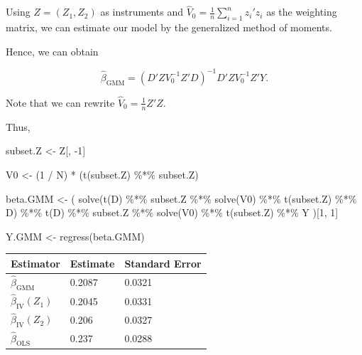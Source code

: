 \documentclass[9pt,twocolumn,twoside,]{pnas-new}
\newenvironment{Shaded}{}{}
\newcommand{\DecValTok}[1]{\textcolor[rgb]{0.25,0.63,0.44}{#1}}
\newcommand{\FunctionTok}[1]{\textcolor[rgb]{0.02,0.16,0.49}{#1}}
\newcommand{\NormalTok}[1]{#1}
\newcommand{\OtherTok}[1]{\textcolor[rgb]{0.00,0.44,0.13}{#1}}
\newcommand{\SpecialCharTok}[1]{\textcolor[rgb]{0.25,0.44,0.63}{#1}}
\begin{document}
Using \(Z = (Z_1, Z_2)\) as instruments and
\(\displaystyle \hat{V}_0 = \frac{1}{n} \sum_{i = 1}^n z_i' z_i\) as the
weighting matrix, we can estimate our model by the generalized method of
moments.

Hence, we can obtain

\[
\hat{\beta}_{\text{GMM}} = \left( D' Z V_0^{-1} Z' D \right)^{-1} D' Z V_0^{-1} Z' Y.
\]

Note that we can rewrite \(\displaystyle \hat{V}_0 = \frac{1}{n} Z' Z\).

Thus,

\begin{Shaded}
\begin{Highlighting}[]
\NormalTok{subset.Z }\OtherTok{\textless{}{-}}\NormalTok{ Z[, }\SpecialCharTok{{-}}\DecValTok{1}\NormalTok{]}

\NormalTok{V0 }\OtherTok{\textless{}{-}}\NormalTok{ (}\DecValTok{1} \SpecialCharTok{/}\NormalTok{ N) }\SpecialCharTok{*}\NormalTok{ (}\FunctionTok{t}\NormalTok{(subset.Z) }\SpecialCharTok{\%*\%}\NormalTok{ subset.Z)}

\NormalTok{beta.GMM }\OtherTok{\textless{}{-}}
\NormalTok{    (}
        \FunctionTok{solve}\NormalTok{(}\FunctionTok{t}\NormalTok{(D) }\SpecialCharTok{\%*\%}\NormalTok{ subset.Z }\SpecialCharTok{\%*\%} \FunctionTok{solve}\NormalTok{(V0) }\SpecialCharTok{\%*\%} \FunctionTok{t}\NormalTok{(subset.Z) }\SpecialCharTok{\%*\%}\NormalTok{ D) }\SpecialCharTok{\%*\%}
            \FunctionTok{t}\NormalTok{(D) }\SpecialCharTok{\%*\%}\NormalTok{ subset.Z }\SpecialCharTok{\%*\%} \FunctionTok{solve}\NormalTok{(V0) }\SpecialCharTok{\%*\%} \FunctionTok{t}\NormalTok{(subset.Z) }\SpecialCharTok{\%*\%}\NormalTok{ Y}
\NormalTok{    )[}\DecValTok{1}\NormalTok{, }\DecValTok{1}\NormalTok{]}

\NormalTok{Y.GMM }\OtherTok{\textless{}{-}} \FunctionTok{regress}\NormalTok{(beta.GMM)}
\end{Highlighting}
\end{Shaded}

\begin{longtable}[]{@{}lll@{}}
\toprule
Estimator & Estimate & Standard Error \\
\midrule
\endhead
\(\hat{\beta}_{\text{GMM}}\) & 0.2087 & 0.0321 \\
\(\hat{\beta}_{\text{IV}} (Z_1)\) & 0.2045 & 0.0331 \\
\(\hat{\beta}_{\text{IV}} (Z_2)\) & 0.206 & 0.0327 \\
\(\hat{\beta}_{\text{OLS}}\) & 0.237 & 0.0288 \\
\bottomrule
\end{longtable}
\end{document}
